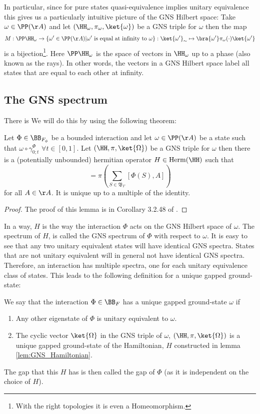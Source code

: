 In particular, since for pure states quasi-equivalence implies unitary equivalence this gives us a particularly intuitive picture of the GNS Hilbert space: Take $\omega\in\PP(\AA)$ and let $(\HH_\omega,\pi_\omega,\ket{\omega})$ be a GNS triple for $\omega$ then the map
\begin{equation}
M:\PP\HH_\omega\rightarrow \{\omega'\in\PP(\AA)|\omega'\text{ is equal at infinity to }\omega\}:\ket{\omega'}_\sim\mapsto \bra{\omega'}\pi_\omega(\cdot)\ket{\omega'}
\end{equation}
is a bijection\footnote{With the right topologies it is even a Homeomorphism.}. Here $\PP\HH_\omega$ is the space of vectors in $\HH_\omega$ up to a phase (also known as the rays). In other words, the vectors in a GNS Hilbert space label all states that are equal to each other at infinity.
\subsection{The GNS spectrum}\label{sec:GNS_Spectrum}
There is  We will do this by using the following theorem:
\begin{lemma}\label{lem:GNS_Hamiltonian}
	Let $\Phi\in\BB_{F_\phi}$ be a bounded interaction and let $\omega\in\PP(\AA)$ be a state such that $\omega\circ\gamma^{\Phi}_{0;t}$ $\forall t\in[0,1]$. Let $(\HH,\pi,\ket{\Omega})$ be a GNS triple for $\omega$ then there is a (potentially unbounded) hermitian operator $H\in\textrm{Herm}(\HH)$ such that
	\begin{equation}
		[H,\pi(A)]=\pi\left(\sum_{S\in\mathfrak{B}_\Gamma}[\Phi(S),A]\right)
	\end{equation}
	for all $A\in\AA$. It is unique up to a multiple of the identity.
\end{lemma}
\begin{proof}
	The proof of this lemma is in Corollary 3.2.48 of \cite{bratteli1979operator}.
\end{proof}
In a way, $H$ is the way the interaction $\Phi$ acts on the GNS Hilbert space of $\omega$. The spectrum of $H$, is called the GNS spectrum of $\Phi$ with respect to $\omega$. It is easy to see that any two unitary equivalent states will have identical GNS spectra. States that are not unitary equivalent will in general not have identical GNS spectra. Therefore, an interaction has multiple spectra, one for each unitary equivalence class of states. This leads to the following definition for a unique gapped ground-state:
\begin{definition}\label{def:UniqueGappedGroundstate}
	We say that the interaction $\Phi\in\BB_F$ has a unique gapped ground-state $\omega$ if
	\begin{enumerate}
		\item Any other eigenstate of $\Phi$ is unitary equivalent to $\omega$.
		\item The cyclic vector $\ket{\Omega}$ in the GNS triple of $\omega$, $(\HH,\pi,\ket{\Omega})$ is a unique gapped ground-state of the Hamiltonian, $H$ constructed in lemma \ref{lem:GNS_Hamiltonian}.
	\end{enumerate}
\end{definition}
The gap that this $H$ has is then called the gap of $\Phi$ (as it is independent on the choice of $H$).
